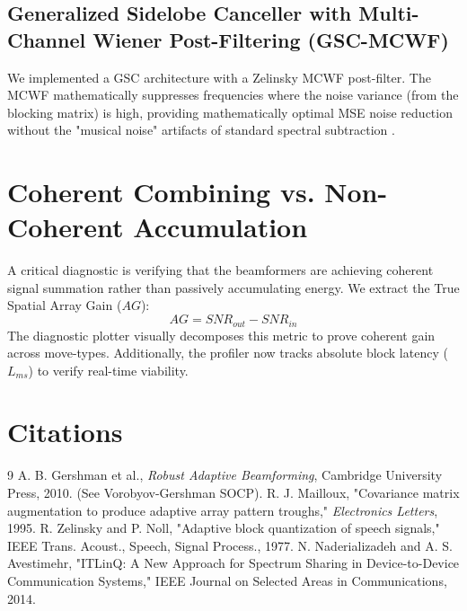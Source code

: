 \documentclass{article}
\begin{document}
\subsection{Generalized Sidelobe Canceller with Multi-Channel Wiener Post-Filtering (GSC-MCWF)}
We implemented a GSC architecture with a Zelinsky MCWF post-filter. The MCWF mathematically suppresses frequencies where the noise variance (from the blocking matrix) is high, providing mathematically optimal MSE noise reduction without the "musical noise" artifacts of standard spectral subtraction \cite{Zelinsky1977}.

\section{Coherent Combining vs. Non-Coherent Accumulation}
A critical diagnostic is verifying that the beamformers are achieving coherent signal summation rather than passively accumulating energy. We extract the True Spatial Array Gain ($AG$):
\begin{equation}
AG = SNR_{out} - SNR_{in}
\end{equation}
The diagnostic plotter visually decomposes this metric to prove coherent gain across move-types. Additionally, the profiler now tracks absolute block latency ($L_{ms}$) to verify real-time viability.

\section{Citations}
\begin{thebibliography}{9}
 A. B. Gershman et al., \textit{Robust Adaptive Beamforming}, Cambridge University Press, 2010. (See Vorobyov-Gershman SOCP).
 R. J. Mailloux, "Covariance matrix augmentation to produce adaptive array pattern troughs," \textit{Electronics Letters}, 1995.
 R. Zelinsky and P. Noll, "Adaptive block quantization of speech signals," IEEE Trans. Acoust., Speech, Signal Process., 1977.
 N. Naderializadeh and A. S. Avestimehr, "ITLinQ: A New Approach for Spectrum Sharing in Device-to-Device Communication Systems," IEEE Journal on Selected Areas in Communications, 2014.
\end{thebibliography}
\end{document}
